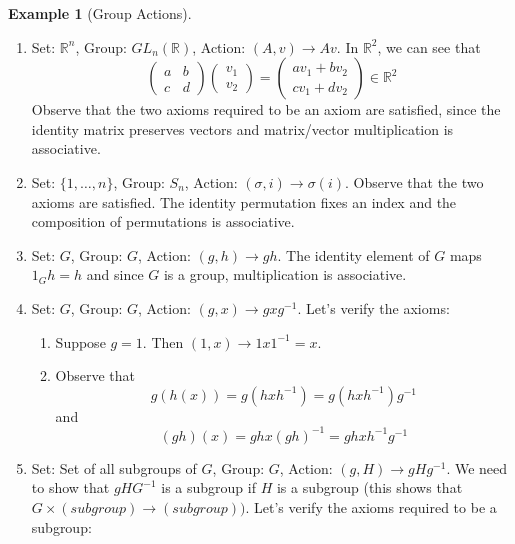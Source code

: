 \documentclass[12pt]{article}
\theoremstyle{definition}
\newcommand{\R}{\mathbb{R}}
\newtheorem{example}{\color{WildStrawberry}Example}
\theoremstyle{definition}
\begin{document}
\begin{example}[Group Actions]
\begin{enumerate}
	\item Set: $\R^n$, Group: $GL_n(\R)$, Action: $(A,v) \to Av$. In $\R^2$, we can see that
	\begin{equation}
		\begin{pmatrix}
		a & b \\
		c & d
		\end{pmatrix}
		\begin{pmatrix}
		v_1 \\ v_2
		\end{pmatrix}
		=
		\begin{pmatrix}
		av_1 + bv_2 \\
		cv_1 + dv_2 
		\end{pmatrix}
		\in \R^2
	\end{equation}
	Observe that the two axioms required to be an axiom are satisfied, since the identity matrix preserves vectors and matrix/vector multiplication is associative. 
	\item Set: $\{1, \ldots, n\}$, Group: $S_n$, Action: $(\sigma, i) \to \sigma(i)$. Observe that the two axioms are satisfied. The identity permutation fixes an index and the composition of permutations is associative. 
	\item Set: $G$, Group: $G$, Action: $(g,h) \to gh$. The identity element of $G$ maps $1_G h = h$ and since $G$ is a group, multiplication is associative. 
	\item Set: $G$, Group: $G$, Action: $(g,x) \to gxg^{-1}$. Let's verify the axioms:
	\begin{enumerate}
		\item Suppose $g=1$. Then $(1,x) \to 1 x 1^{-1} = x$. 
		\item Observe that
		\begin{equation}
			g(h(x)) = g(hxh^{-1}) = g(hxh^{-1})g^{-1} 
		\end{equation}
		and
		\begin{equation}
			(gh)(x) = gh x (gh)^{-1} = gh x h^{-1} g^{-1}
		\end{equation}
	\end{enumerate}
	\item Set: Set of all subgroups of $G$, Group: $G$, Action: $(g,H) \to gHg^{-1}$. We need to show that $gHG^{-1}$ is a subgroup if $H$ is a subgroup (this shows that $G \times (subgroup) \to (subgroup))$. Let's verify the axioms required to be a subgroup:
	\begin{enumerate}

\end{enumerate}
\end{enumerate}
\end{example}
\end{document}
